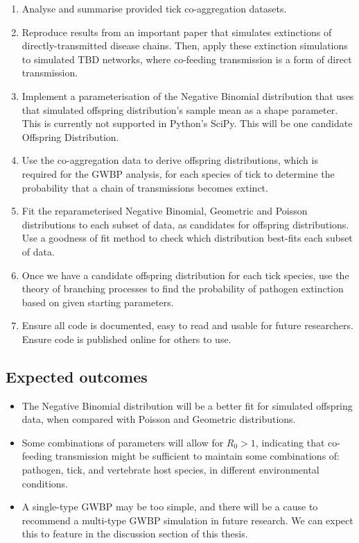 \documentclass{article}
\begin{document}
\begin{enumerate}
  \item Analyse and summarise provided tick co-aggregation datasets. 
  \item Reproduce results from an important paper that simulates extinctions of directly-transmitted disease chains. Then, apply these extinction simulations to simulated TBD networks, where co-feeding transmission is a form of direct transmission.
  \item Implement a parameterisation of the Negative Binomial distribution that uses that simulated offspring distribution’s sample mean as a shape parameter. This is currently not supported in Python’s SciPy. This will be one candidate Offspring Distribution.
  \item Use the co-aggregation data to derive offspring distributions, which is required for the GWBP analysis, for each species of tick to determine the probability that a chain of transmissions becomes extinct.
  \item Fit the reparameterised Negative Binomial, Geometric and Poisson distributions to each subset of data, as candidates for offspring distributions. Use a goodness of fit method to check which distribution best-fits each subset of data.
  \item Once we have a candidate offspring distribution for each tick species, use the theory of branching processes to find the probability of pathogen extinction based on given starting parameters.
  \item Ensure all code is documented, easy to read and usable for future researchers. Ensure code is published online for others to use.
\end{enumerate}

\subsection{Expected outcomes}

\begin{itemize}
  \item The Negative Binomial distribution will be a better fit for simulated offspring data, when compared with Poisson and Geometric distributions.
  \item Some combinations of parameters will allow for $ R_0 > 1 $, indicating that co-feeding transmission might be sufficient to maintain some combinations of: pathogen, tick, and vertebrate host species, in different environmental conditions.
  \item A single-type GWBP may be too simple, and there will be a cause to recommend a multi-type GWBP simulation in future research. We can expect this to feature in the discussion section of this thesis.
\end{itemize}
\end{document}
